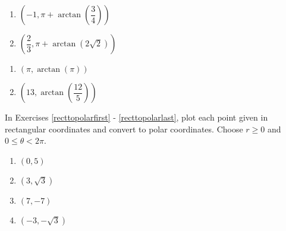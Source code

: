\begin{multicols}{2} 

\begin{enumerate}

\setcounter{enumi}{\value{HW}}

\item $\left( -1, \pi + \arctan\left(\dfrac{3}{4}\right) \right)$ 
\item $\left( \dfrac{2}{3}, \pi + \arctan\left(2\sqrt{2}\right) \right)$

\setcounter{HW}{\value{enumi}}

\end{enumerate}

\end{multicols}

\begin{multicols}{2} 

\begin{enumerate}

\setcounter{enumi}{\value{HW}}

\item $\left( \pi, \arctan(\pi) \right)$ 
\item $\left( 13, \arctan \left( \dfrac{12}{5} \right) \right)$ \label{polartorectlast}

\setcounter{HW}{\value{enumi}}

\end{enumerate}

\end{multicols}

In Exercises \ref{recttopolarfirst} - \ref{recttopolarlast}, plot each point given in rectangular coordinates and convert to polar coordinates.  Choose $r \geq 0$ and $0 \leq \theta < 2\pi$.  

\begin{multicols}{4}

\begin{enumerate}

\setcounter{enumi}{\value{HW}}

\item $(0, 5)$ \label{recttopolarfirst} 
\item $(3, \sqrt{3})$
\item $(7, -7)$
\item $(-3, -\sqrt{3})$

\setcounter{HW}{\value{enumi}}

\end{enumerate}

\end{multicols}

